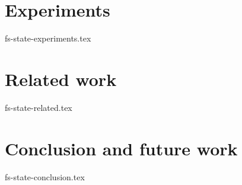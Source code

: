 \documentclass[conference]{IEEEtran}
\theoremstyle{definition}
\begin{document}
\section {Experiments}
 {fs-state-experiments.tex}

\section {Related work}
 {fs-state-related.tex}

\section {Conclusion and future work}
 {fs-state-conclusion.tex}

\balance




\newpage
\end{document}
